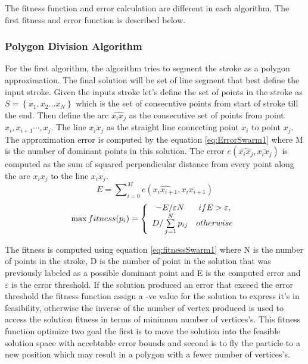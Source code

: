 The fitness function and error calculation are different in each algorithm. The first fitness and error function is described below. 


\subsubsection{Polygon Division Algorithm}
\label{sec:PolygonDivisionAlgorithm}
For the first algorithm, the algorithm tries to segment the stroke as a polygon approximation. The final solution will be set of line segment that best define the input stroke. Given the inputs stroke let's define the set of points in the stroke as  $S = \left\{ {x_1 ,x_2  \ldots x_N } \right\}$ which is the set of consecutive points from start of stroke till the end. Then define the arc $\widehat{x_ix_j}$ as the consecutive set of points from point $x_i,x_{i+1} \cdots,x_j$. The line
$\overline{x_i x_j} $ as the straight line connecting point $x_i$ to point $x_j$. The approximation error is computed by the equation \ref{eq:ErrorSwarm1}  where M is the number of dominant points in this solution.  The error $ e ( \widehat{x_ix_j},\overline{x_i x_j})$ is computed as the sum of squared perpendicular distance from every point along the arc $\widehat{x_ix_j}$ to the line $\overline{x_i x_j}$.  \\
\begin{equation}
E=\sum\nolimits_{i = 0}^M e ( \widehat{x_ix_{i+1}},\overline{x_i x_{i+1}})
\label{eq:ErrorSwarm1}
\end{equation}
\begin{equation}
\max fitness(p_i ) = \left\{ {\begin{array}{*{20}c}
   { - E/\varepsilon N} & {ifE > \varepsilon ,}  \\
   {D/\sum\limits_{j = 1}^N {p_{ij} } } & {otherwise}  \\
\end{array}} \right.
\label{eq:fitnessSwarm1}
\end{equation}%

The fitness is computed using equation \ref{eq:fitnessSwarm1} where N is the number of points in the stroke, D is the number of point in the solution that was previously labeled as a possible dominant point and E is the computed error and $\varepsilon$ is the error threshold.  If the solution produced an error that exceed the error threshold the fitness function assign a -ve value for the solution to express it's in feasibility, otherwise the inverse of the number of vertex produced is used to access the solution fitness in terms of minimum number of vertices's.  This fitness function optimize two goal the first is to move the solution into the feasible solution space with accebtable error bounds and second is to fly the particle to a new position which may result in a polygon with a fewer number of vertices's. 

